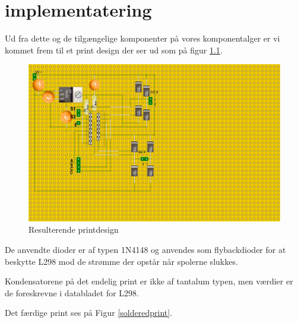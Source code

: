 ﻿\chapter{implementatering}

Ud fra dette og de tilgængelige komponenter på vores komponentalger er vi kommet frem til et print design der ser ud som på figur \ref{printdesign}.

\begin{figure}[H]
	\centering
	\includegraphics[scale=0.25,trim=0 20 500 0, clip]{billeder/printdesign}
	\caption{Resulterende printdesign}
	\label{printdesign}
\end{figure}

De anvendte dioder er af typen 1N4148 og anvendes som flybackdioder for at beskytte L298 mod de strømme der opstår når spolerne slukkes.

Kondensatorene på det endelig print er ikke af tantalum typen, men værdier er de foreskrevne i databladet for L298.

Det færdige print ses på Figur \ref{solderedprint}.

